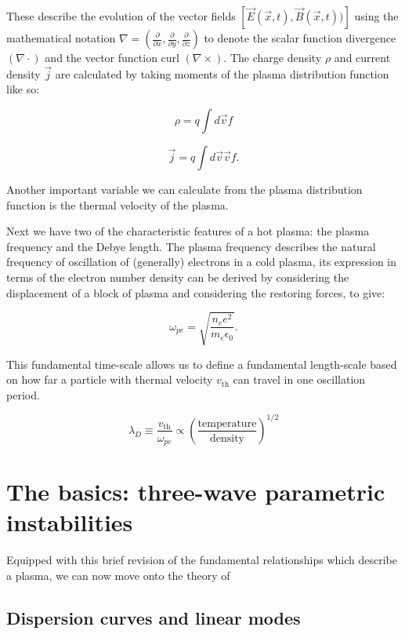 These describe the evolution of the vector fields $[\vec{E}(\vec{x},t),\vec{B}(\vec{x},t))]$ using the mathematical notation $\nabla = \left(\frac{\partial}{\partial x},\frac{\partial}{\partial y},\frac{\partial}{\partial z} \right)$ to denote the scalar function divergence $(\nabla \cdot)$ and the vector function curl $(\nabla \times)$. The charge density $\rho$ and current density $\vec{j}$ are calculated by taking moments of the plasma distribution function like so:

\begin{equation}
\rho= q \int d \vec{v} f
\end{equation}

\begin{equation}
\vec{j} = q \int d \vec{v} \vec{v} f.
\end{equation}

Another important variable we can calculate from  the plasma distribution function is the thermal velocity of the plasma. 


Next we have two of the characteristic features of a hot plasma: the plasma frequency and the Debye length. The plasma frequency describes the natural frequency of oscillation of (generally) electrons in a cold plasma, its expression in terms of the electron number density can be derived by considering the displacement of a block of plasma and considering the restoring forces, to give:

\begin{equation}
	\omega_{pe} = \sqrt{\frac{n_e e^2}{m_e \epsilon_0}}.
\end{equation}

This fundamental time-scale allows us to define a fundamental length-scale based on how far a particle with thermal velocity $v_{\text{th}}$ can travel in one oscillation period.

\begin{equation}
	\lambda_D \equiv \frac{v_{\mathrm{th}}}{\omega_{pe}} \propto \left(\frac{\mathrm{temperature}}{\mathrm{density}}\right)^{1/2}
\end{equation}\label{eqn:debye}

\section{The basics: three-wave parametric instabilities}
Equipped with this brief revision of the fundamental relationships which describe a plasma, we can now move onto the theory of

\subsection{Dispersion curves and linear modes}

